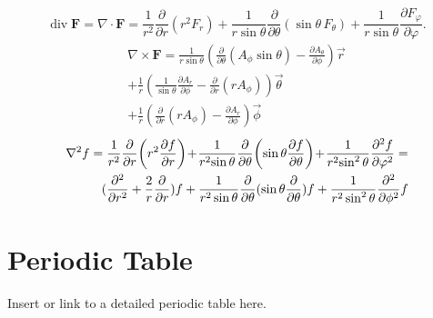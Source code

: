 \documentclass[12pt,a4paper]{article}
\begin{document}
\begin{equation}
	\operatorname {div} \mathbf {F} =\nabla \cdot \mathbf {F} ={\frac {1}{r^{2}}}{\frac {\partial }{\partial r}}\left(r^{2}F_{r}\right)+{\frac {1}{r\sin \theta }}{\frac {\partial }{\partial \theta }}(\sin \theta \,F_{\theta })+{\frac {1}{r\sin \theta }}{\frac {\partial F_{\varphi }}{\partial \varphi }}.
\end{equation}
\begin{equation}
	\begin{aligned}
		\nabla \times \mathbf{F} = \frac{1}{r\sin\theta} (\frac{\partial }{\partial \theta} (A_\phi \sin \theta ) - \frac{\partial A_\theta}{\partial \phi}) \vec{r} \\
		+ \frac{1}{r}(\frac{1}{\sin\theta }\frac{\partial A_r}{\partial \phi} - \frac{\partial}{\partial r }(rA_\phi)) \vec{\theta} \\
		+ \frac{1}{r} (\frac{\partial}{\partial r}(r A_\phi) - \frac{\partial A_r}{\partial \phi}) \vec{\phi}
	\end{aligned}
\end{equation}
\begin{equation}
	\begin{aligned}
		\nabla^2 f = {1 \over r^{2}}{\partial  \over \partial r}\!\left(r^{2}{\partial f \over \partial r}\right)\!+\!{1 \over r^{2}\!\sin \theta }{\partial  \over \partial \theta }\!\left(\sin \theta {\partial f \over \partial \theta }\right)\!+\!{1 \over r^{2}\!\sin ^{2}\theta }{\partial ^{2}f \over \partial \varphi ^{2}} = \\ (\frac{\partial^2}{\partial r^2} + \frac{2}{r} \frac{\partial}{\partial r}) f
		+ \frac{1}{r^2 \sin \theta }\frac{\partial}{\partial \theta} (\sin \theta \frac{\partial}{\partial \theta})f
		+ \frac{1}{r^2 \sin ^2 \theta } \frac{\partial ^2}{\partial \phi ^2 } f
	\end{aligned}
\end{equation}
	
	
	\section*{Periodic Table}
	Insert or link to a detailed periodic table here.
	
\end{document}
